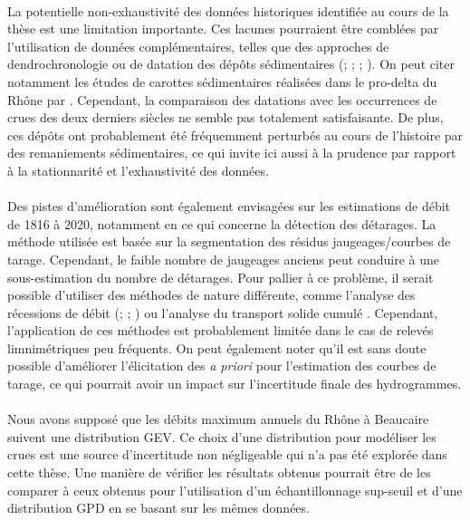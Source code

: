 	\paragraph{} La potentielle non-exhaustivité des données historiques identifiée au cours de la thèse est une limitation importante. Ces lacunes pourraient être comblées par l'utilisation de données complémentaires, telles que des approches de dendrochronologie \citep{ballesteros-canovas_review_2015} ou de datation des dépôts sédimentaires (\cite{dezileau_multidating_2014}; \cite{engeland_new_2020}; \cite{corella_1400-years_2021}; \cite{wilhelm_reconstructing_2022}). On peut citer notamment les études de carottes sédimentaires réalisées dans le pro-delta du Rhône par \citet{fanget_historical_2013}. Cependant, la comparaison des datations avec les occurrences de crues des deux derniers siècles ne semble pas totalement satisfaisante. De plus, ces dépôts ont probablement été fréquemment perturbés au cours de l'histoire par des remaniements sédimentaires, ce qui invite ici aussi à la prudence par rapport à la stationnarité et l'exhaustivité des données. 
	
	\paragraph{} Des pistes d'amélioration sont également envisagées sur les estimations de débit de 1816 à 2020, notamment en ce qui concerne la détection des détarages. La méthode utilisée est basée sur la segmentation des résidus jaugeages/courbes de tarage. Cependant, le faible nombre de jaugeages anciens peut conduire à une sous-estimation du nombre de détarages. Pour pallier à ce problème, il serait possible d'utiliser des méthodes de nature différente, comme l'analyse des récessions de débit (\cite{vogel_estimation_1996}; \cite{chapman_comparison_1999}; \cite{darienzo_detection_2021-1}) ou l'analyse du transport solide cumulé \citep{darienzo_detection_2021-1}. Cependant, l'application de ces méthodes est probablement limitée dans le cas de relevés limnimétriques peu fréquents. On peut également noter qu'il est sans doute possible d'améliorer l'élicitation des \textit{a priori} pour l'estimation des courbes de tarage, ce qui pourrait avoir un impact sur l'incertitude finale des hydrogrammes.	
		
		\paragraph{} Nous avons supposé que les débits maximum annuels du Rhône à Beaucaire suivent une distribution GEV. Ce choix d'une distribution pour modéliser les crues est une source d'incertitude non négligeable qui n'a pas été explorée dans cette thèse. Une manière de vérifier les résultats obtenus pourrait être de les comparer à ceux obtenus pour l'utilisation d'un échantillonnage sup-seuil et d'une distribution GPD en se basant sur les mêmes données. 		
		
